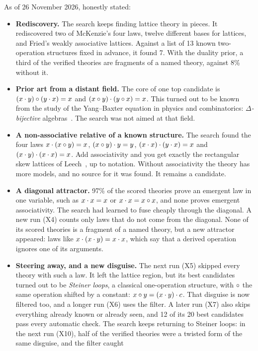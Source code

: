 \documentclass[11pt,a4paper]{article}
\begin{document}
As of 26 November 2026, honestly stated:
\begin{itemize}
\item \textbf{Rediscovery.} The search keeps finding lattice theory in pieces. It rediscovered two of McKenzie's four
  laws, twelve different bases for lattices, and Fried's weakly associative lattices. Against a list of 13 known
  two-operation structures fixed in advance, it found 7. With the duality prior, a third of the verified theories
  are fragments of a named theory, against 8\% without it.
\item \textbf{Prior art from a distant field.} The core of one top candidate is $(x\cdot y)\circ(y\cdot x)=x$ and
  $(x\circ y)\cdot(y\circ x)=x$. This turned out to be known from the study of the Yang--Baxter equation in physics and
  combinatorics: \emph{$\Delta$-bijective} algebras~\cite{bonatto}. The search was not aimed at that field.
\item \textbf{A non-associative relative of a known structure.} The search found the four laws $x\cdot(x\circ y)=x$,
  $(x\circ y)\cdot y=y$, $(x\cdot x)\cdot(y\cdot x)=x$ and $(x\cdot y)\cdot(x\cdot x)=x$. Add associativity and
  you get exactly the rectangular skew lattices of Leech~\cite{leech2020}, up to notation. Without associativity the
  theory has more models, and no source for it was found. It remains a candidate.
\item \textbf{A diagonal attractor.} 97\% of the scored theories prove an emergent law in one variable, such as
  $x\cdot x=x$ or $x\cdot x=x\circ x$, and none proves emergent associativity. The search had learned to fuse cheaply
  through the diagonal. A new run (X4) counts only laws that do not come from the diagonal. None of its scored
  theories is a fragment of a named theory, but a new attractor appeared: laws like $x\cdot(x\cdot y)=x\cdot x$, which say
  that a derived operation ignores one of its arguments.
\item \textbf{Steering away, and a new disguise.} The next run (X5) skipped every theory with such a law. It left the
  lattice region, but its best candidates turned out to be \emph{Steiner loops}, a classical one-operation structure,
  with $\circ$ the same operation shifted by a constant: $x\circ y=(x\cdot y)\cdot c$. That disguise is now filtered too,
  and a longer run (X6) uses the filter. A later run (X7) also skips everything already known or already seen,
  and 12 of its 20 best candidates pass every automatic check. The search keeps returning to Steiner loops: in the
  next run (X10), half of the verified theories were a twisted form of the same disguise, and the filter caught

\end{itemize}
\end{document}
